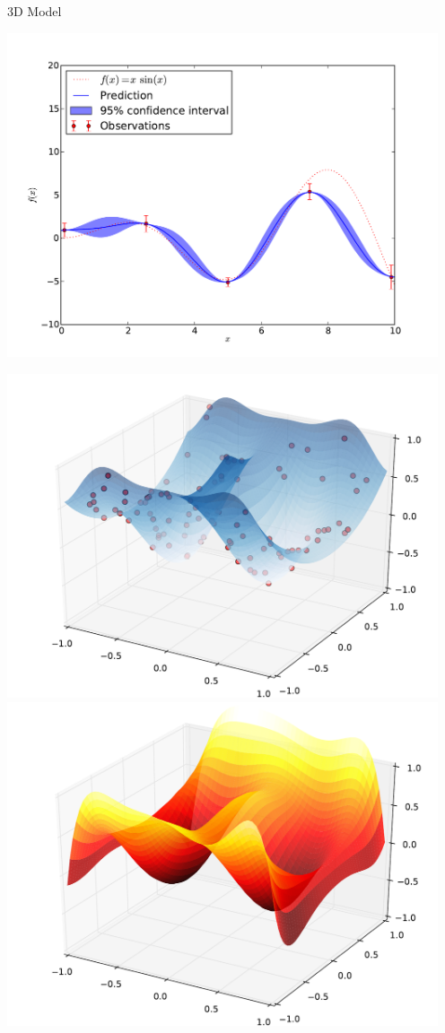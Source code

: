 \documentclass[final]{beamer}
\begin{document}
\begin{frame}{}
\begin{textblock}{27.5}
\begin{block}{3D Model}
\begin{center}\includegraphics[width=5.0in]{1DGaussianProcess.pdf}\end{center}
\includegraphics[width=5.0in]{2DGaussianProcess1.pdf}
\includegraphics[width=5.0in]{2DGaussianProcess2.pdf}


\end{block}
\end{textblock}
\end{frame}
\end{document}
